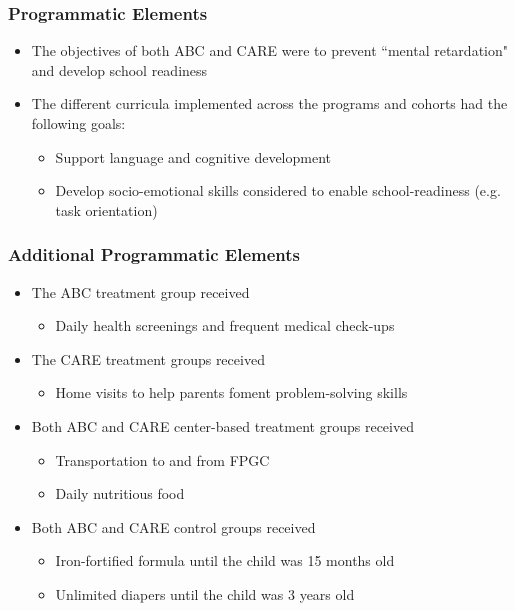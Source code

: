 \documentclass[static]{JJH-Beamer}
\begin{document}
\begin{frame}
\frametitle{Programmatic Elements}
\begin{itemize}
\item The objectives of both ABC and CARE were to prevent ``mental retardation" and develop school readiness
\item The different curricula implemented across the programs and cohorts had the following goals:
	\begin{itemize}
		\item Support language and cognitive development
		\item Develop socio-emotional skills considered to enable school-readiness (e.g. task orientation)
	\end{itemize}
\end{itemize}
\end{frame}


\begin{frame}
\frametitle{Additional Programmatic Elements}
\begin{itemize}
	\item The ABC treatment group received
	\begin{itemize}
		\item Daily health screenings and frequent medical check-ups 
	\end{itemize}
	\item The CARE treatment groups received
		\begin{itemize}
		\item Home visits to help parents foment problem-solving skills
		\end{itemize}
	\item Both ABC and CARE center-based treatment groups received
	\begin{itemize}
		\item Transportation to and from FPGC
		\item Daily nutritious food
	\end{itemize}
	\item Both ABC and CARE control groups received
	\begin{itemize}
		\item Iron-fortified formula until the child was 15 months old
		\item Unlimited diapers until the child was 3 years old
	\end{itemize}
\end{itemize}
\end{frame}
\end{document}
